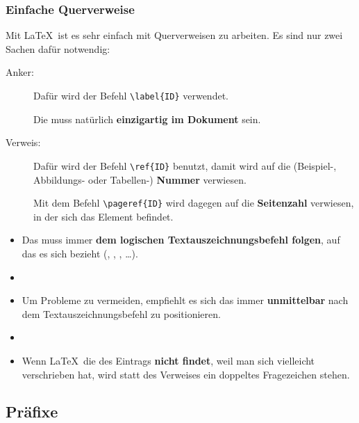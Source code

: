 \begin{frame}[fragile]
\frametitle{Einfache Querverweise}

Mit \LaTeX\ ist es sehr einfach mit Querverweisen zu arbeiten. Es sind nur zwei Sachen dafür notwendig:

\begin{description}
	\item[Anker:] Dafür wird der Befehl \lstinline|\label{ID}| verwendet. 
	
	Die  muss natürlich \textbf{einzigartig im Dokument} sein.
	
	\item[]
	
	\item[Verweis:] Dafür wird der Befehl \lstinline|\ref{ID}| benutzt, damit wird auf die (Beispiel-, Ab\-bil\-dungs- oder Tabellen-) \textbf{Nummer} verwiesen. 
	
	Mit dem Befehl \lstinline|\pageref{ID}| wird dagegen auf die \textbf{Seitenzahl} verwiesen, in der sich das Element befindet.
\end{description}

\end{frame}

\begin{frame}[fragile]

\begin{itemize}
	\item Das  muss immer \textbf{dem logischen Textauszeichnungsbefehl folgen}, auf das es sich bezieht (\zB {}, , , \dots). 
	\item[]
	
	\item Um Probleme zu vermeiden, empfiehlt es sich das  immer \textbf{unmittelbar} nach dem Textauszeichnungsbefehl zu positionieren.
	\item[]
	
	\item Wenn \LaTeX\ die  des Eintrags \textbf{nicht findet}, weil man sich vielleicht verschrieben hat, wird statt des Verweises ein doppeltes Fragezeichen  stehen.  

\end{itemize}
%
\end{frame}

\subsection{Präfixe}

